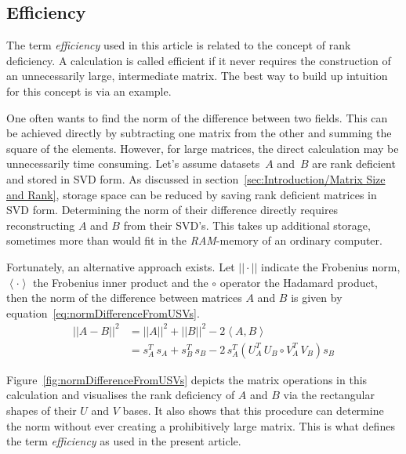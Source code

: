 \documentclass[ijgi,article,submit,moreauthors,pdftex,10pt,a4paper]{Definitions/mdpi}
\begin{document}
\subsection{Efficiency}
\label{sec:Introduction/Efficiency}

The term \textit{efficiency} used in this article is related to the concept of rank deficiency. A calculation is called efficient if it never requires the construction of an unnecessarily large, intermediate matrix. The best way to build up intuition for this concept is via an example.

One often wants to find the norm of the difference between two fields. This can be achieved directly by subtracting one matrix from the other and summing the square of the elements. However, for large matrices, the direct calculation may be unnecessarily time consuming. Let's assume datasets~$A$ and~$B$ are rank deficient and stored in SVD form. As discussed in section~\ref{sec:Introduction/Matrix Size and Rank}, storage space can be reduced by saving rank deficient matrices in SVD form. Determining the norm of their difference directly requires reconstructing $A$ and $B$ from their SVD's. This takes up additional storage, sometimes more than would fit in the \textit{RAM}-memory of an ordinary computer.

Fortunately, an alternative approach exists. Let $|| \cdot ||$ indicate the Frobenius norm, $\left\langle \cdot \right\rangle$ the Frobenius inner product and the $\circ$ operator the Hadamard product, then the norm of the difference between matrices $A$ and $B$ is given by equation~\ref{eq:normDifferenceFromUSVs}.
\begin{equation}
\label{eq:normDifferenceFromUSVs}
\begin{split}
||A-B||^{2} & = ||A||^{2} + ||B||^{2} - 2 \left\langle A, B \right\rangle \\
& = s_{A}^{T} \, s_{A} + s_{B}^{T} \, s_{B} - 2 \, s_{A}^{T} \left( U_{A}^{T} \, U_{B} \circ V_{A}^{T} \, V_{B} \right) s_{B}
\end{split}
\end{equation}

Figure~\ref{fig:normDifferenceFromUSVs} depicts the matrix operations in this calculation and visualises the rank deficiency of $A$ and $B$ via the rectangular shapes of their $U$ and $V$ bases. It also shows that this procedure can determine the norm without ever creating a prohibitively large matrix. This is what defines the term \textit{efficiency} as used in the present article.
\end{document}
